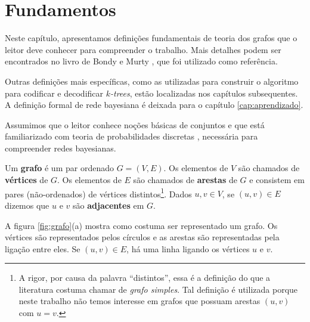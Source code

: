 \chapter{Fundamentos}
\label{cap:fundamentos}

Neste capítulo, apresentamos definições fundamentais de teoria dos grafos que o leitor deve conhecer para compreender o trabalho. Mais detalhes podem ser encontrados no livro de Bondy e Murty \cite{bondy}, que foi utilizado como referência.

Outras definições mais específicas, como as utilizadas para construir o algoritmo para codificar e decodificar \emph{$k$-trees}, estão localizadas nos capítulos subsequentes. A definição formal de rede bayesiana é deixada para o capítulo \ref{cap:aprendizado}.

Assumimos que o leitor conhece noções básicas de conjuntos e que está familiarizado com teoria de probabilidades discretas \cite{koller}, necessária para compreender redes bayesianas.

\vspace{2em}

Um \textbf{grafo} é um par ordenado $G = (V, E)$. Os elementos de $V$ são chamados de \textbf{vértices} de $G$. Os elementos de $E$ são chamados de \textbf{arestas} de $G$ e consistem em pares (não-ordenados) de vértices distintos\footnote{A rigor, por causa da palavra ``distintos'', essa é a definição do que a literatura costuma chamar de \emph{grafo simples}. Tal definição é utilizada porque neste trabalho não temos interesse em grafos que possuam arestas $(u, v)$ com $u=v$.}. Dados $u, v \in V$, se $(u, v) \in E$ dizemos que $u$ e $v$ são \textbf{adjacentes} em $G$.

A figura \ref{fig:grafo}(a) mostra como costuma ser representado um grafo. Os vértices são representados pelos círculos e as arestas são representadas pela ligação entre eles. Se $(u, v) \in E$, há uma linha ligando os vértices $u$ e $v$.

